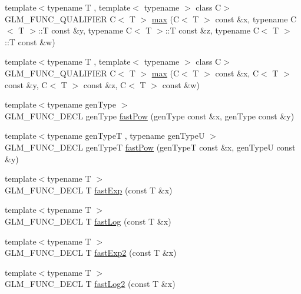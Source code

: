 \begin{DoxyCompactItemize}
\item 
{\footnotesize template$<$typename T , template$<$ typename $>$ class C$>$ }\\G\+L\+M\+\_\+\+F\+U\+N\+C\+\_\+\+Q\+U\+A\+L\+I\+F\+I\+ER C$<$ T $>$ \hyperlink{group__gtx__extented__min__max_ga7cca8b53cfda402040494cdf40fbdf4a}{max} (C$<$ T $>$ const \&x, typename C$<$ T $>$\+::T const \&y, typename C$<$ T $>$\+::T const \&z, typename C$<$ T $>$\+::T const \&w)
\item 
{\footnotesize template$<$typename T , template$<$ typename $>$ class C$>$ }\\G\+L\+M\+\_\+\+F\+U\+N\+C\+\_\+\+Q\+U\+A\+L\+I\+F\+I\+ER C$<$ T $>$ \hyperlink{group__gtx__extented__min__max_gaacffbc466c2d08c140b181e7fd8a4858}{max} (C$<$ T $>$ const \&x, C$<$ T $>$ const \&y, C$<$ T $>$ const \&z, C$<$ T $>$ const \&w)
\item 
{\footnotesize template$<$typename gen\+Type $>$ }\\G\+L\+M\+\_\+\+F\+U\+N\+C\+\_\+\+D\+E\+CL gen\+Type \hyperlink{group__gtx__fast__exponential_ga842ec5e981c76f8aae7ae14972795378}{fast\+Pow} (gen\+Type const \&x, gen\+Type const \&y)
\item 
{\footnotesize template$<$typename gen\+TypeT , typename gen\+TypeU $>$ }\\G\+L\+M\+\_\+\+F\+U\+N\+C\+\_\+\+D\+E\+CL gen\+TypeT \hyperlink{group__gtx__fast__exponential_ga08af6240d87ce7b9851c9095808c1eb8}{fast\+Pow} (gen\+TypeT const \&x, gen\+TypeU const \&y)
\item 
{\footnotesize template$<$typename T $>$ }\\G\+L\+M\+\_\+\+F\+U\+N\+C\+\_\+\+D\+E\+CL T \hyperlink{group__gtx__fast__exponential_ga22a548f1bf42c53898c140e56af16529}{fast\+Exp} (const T \&x)
\item 
{\footnotesize template$<$typename T $>$ }\\G\+L\+M\+\_\+\+F\+U\+N\+C\+\_\+\+D\+E\+CL T \hyperlink{group__gtx__fast__exponential_ga0130dd03ca124c27dc2094de7ee47e8a}{fast\+Log} (const T \&x)
\item 
{\footnotesize template$<$typename T $>$ }\\G\+L\+M\+\_\+\+F\+U\+N\+C\+\_\+\+D\+E\+CL T \hyperlink{group__gtx__fast__exponential_ga62216328ac3af1811add813d0804437d}{fast\+Exp2} (const T \&x)
\item 
{\footnotesize template$<$typename T $>$ }\\G\+L\+M\+\_\+\+F\+U\+N\+C\+\_\+\+D\+E\+CL T \hyperlink{group__gtx__fast__exponential_gadff374a7349142c0ae65f476b9bf4886}{fast\+Log2} (const T \&x)

\end{DoxyCompactItemize}
